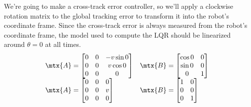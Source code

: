 We're going to make a cross-track error controller, so we'll apply a clockwise
rotation matrix to the global tracking error to transform it into the robot's
coordinate frame. Since the cross-track error is always measured from the
robot's coordinate frame, the \gls{model} used to compute the LQR should be
linearized around $\theta = 0$ at all times.
\begin{equation*}
  \begin{array}{ll}
    \mtx{A} =
    \begin{bmatrix}
      0 & 0 & -v\sin 0 \\
      0 & 0 & v\cos 0 \\
      0 & 0 & 0
    \end{bmatrix} &
    \mtx{B} =
    \begin{bmatrix}
      \cos 0 & 0 \\
      \sin 0 & 0 \\
      0 & 1
    \end{bmatrix} \\
    \mtx{A} =
    \begin{bmatrix}
      0 & 0 & 0 \\
      0 & 0 & v \\
      0 & 0 & 0
    \end{bmatrix} &
    \mtx{B} =
    \begin{bmatrix}
      1 & 0 \\
      0 & 0 \\
      0 & 1
    \end{bmatrix}
  \end{array}
\end{equation*}

